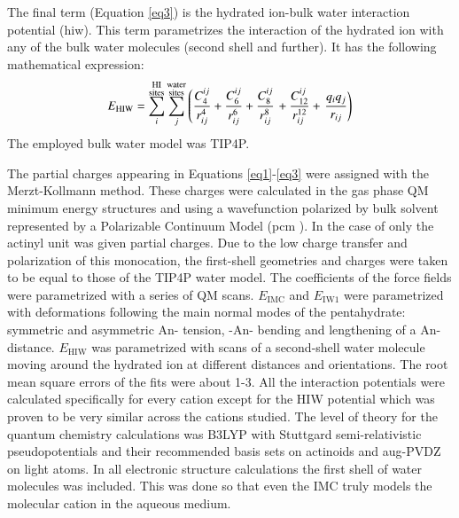 The final term (Equation \ref{eq3}) is the hydrated ion-bulk water interaction potential (\gls{hiw}). 
This term parametrizes 
the
interaction of the hydrated ion with any of the bulk water molecules (second shell and further). It 
has the 
following mathematical expression:
\begin{equation}\label{eq3}
E_{\text{HIW}} = \sum_{i}^{\substack{\text{HI} \vspace{0.02cm}\\ \text{sites} }} 
\sum_{j}^{\substack{\text{water} \vspace{0.02cm}\\ \text{sites} } }\left(
\frac{C_{4}^{ij}}{r_{ij}^{4}}+\frac{C_{6}^{ij}}{r_{ij}^{6}}+\frac{C_{8}^{ij}}{r_{ij}^{8}}\right.+
\frac{C_{12}^{ij}}{r_{ij}^{12}} +
\left.\frac{q_{i}q_{j}}{r_{ij}}\right)
\end{equation}
The employed bulk water model was TIP4P\cite{TIP4P_JChemPhys_Jorgensen_1983}. 

The partial charges appearing in Equations \ref{eq1}-\ref{eq3} were assigned with the 
Merzt-Kollmann 
method\cite{MK1_Kollman_JCompChem_1984,MK2_MerzKollman_JCompChem_1990}. These charges were 
calculated in the gas pha\-se QM minimum energy structures and using a wavefunction 
polarized by bulk solvent represented by a Polarizable Continuum Model (\gls{pcm} 
)\cite{PCM1_ChemPhys_Tomasi_1981,PCM2_JChemPhys_Tomasi_1997}. In 
the case 
of \ce{[NpO2*(H2O)5]^{+}} only the actinyl unit was given partial charges. Due to the low charge 
transfer and polarization of this monocation, the first-shell geometries and charges were taken to 
be 
equal to those of the TIP4P water model. The coefficients of the 
force fields were parametrized with a series of QM scans. $E_\text{IMC}$ and 
$E_\text{IW1}$ were parametrized with deformations following the main normal modes of the 
pentahydrate: symmetric and asymmetric An- tension, -An- bending 
and lengthening of a An- distance. $E_\text{HIW}$ was parametrized with scans of a 
second-shell water molecule moving around the hydrated ion at different distances and orientations. 
The root mean square errors of the fits were about 1-\SI{3}{\kcalmol}. All the interaction 
potentials 
were 
calculated specifically for every cation except for the HIW potential which was proven to be very 
similar across the cations studied. The level of theory for the quantum chemistry calculations was 
B3LYP with Stuttgard semi-relativistic pseudopotentials and their recommended basis sets on 
actinoids and aug-PVDZ on light 
atoms\cite{B3LYP1,B3LYP2_GAUSSIAN,DunningBasisSet3_Dunning_JChemPhys_1993,RECPStuttgart}. In all 
electronic structure calculations the first shell of water molecules was included. This was done 
so that even the IMC truly models the molecular cation in the aqueous medium. 

